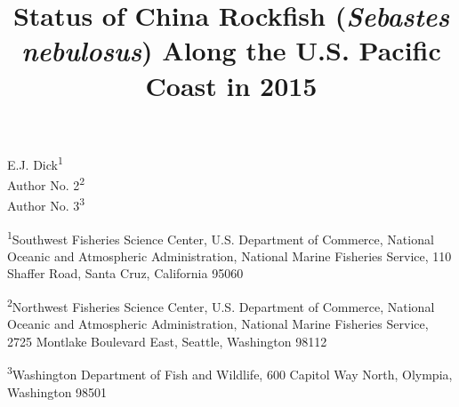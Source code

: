 \documentclass[12pt,]{article}
\title{Status of China Rockfish (\emph{Sebastes nebulosus}) Along the U.S.
Pacific Coast in 2015}
\author{}
\date{}
\begin{document}
\maketitle


\begin{center}
\thispagestyle{empty}


\vspace{.5cm}




E.J. Dick\textsuperscript{1}\\
Author No. 2\textsuperscript{2}\\
Author No. 3\textsuperscript{3}\\

\vspace{.5cm}

\small
\textsuperscript{1}Southwest Fisheries Science Center, U.S. Department of Commerce, National Oceanic and Atmospheric Administration, National Marine Fisheries Service, 110 Shaffer Road, Santa Cruz, California 95060\\

\vspace{.3cm}

\textsuperscript{2}Northwest Fisheries Science Center, U.S. Department of Commerce, National Oceanic and Atmospheric Administration, National Marine Fisheries Service, 2725 Montlake Boulevard East, Seattle, Washington 98112\\

\vspace{.3cm}

\textsuperscript{3}Washington Department of Fish and Wildlife, 600 Capitol Way North, Olympia, Washington 98501\\


\end{center}
\end{document}
